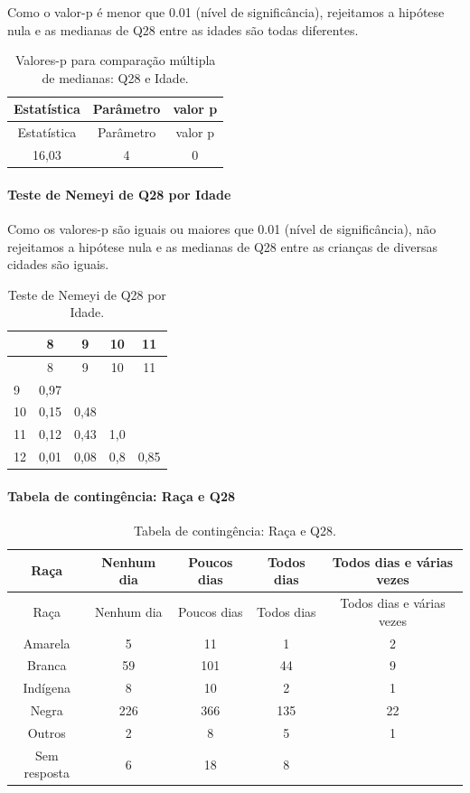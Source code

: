 \documentclass[]{article}
\let\oldparagraph\paragraph
\renewcommand{\paragraph}[1]{\oldparagraph{#1}\mbox{}}
\begin{document}
Como o valor-p é menor que 0.01 (nível de significância), rejeitamos a hipótese nula e as medianas de Q28 entre as idades são todas diferentes.

\begin{longtable}[]{@{}ccc@{}}
\caption{\label{tab:unnamed-chunk-865}Valores-p para comparação múltipla de medianas: Q28 e Idade.}\tabularnewline
\toprule
Estatística & Parâmetro & valor p\tabularnewline
\midrule
\endfirsthead
\toprule
Estatística & Parâmetro & valor p\tabularnewline
\midrule
\endhead
16,03 & 4 & 0\tabularnewline
\bottomrule
\end{longtable}

\hypertarget{teste-de-nemeyi-de-q28-por-idade}{%
\paragraph{Teste de Nemeyi de Q28 por Idade}\label{teste-de-nemeyi-de-q28-por-idade}}

Como os valores-p são iguais ou maiores que 0.01 (nível de significância), não rejeitamos a hipótese nula e as medianas de Q28 entre as crianças de diversas cidades são iguais.

\begin{longtable}[]{@{}lcccc@{}}
\caption{\label{tab:unnamed-chunk-867}Teste de Nemeyi de Q28 por Idade.}\tabularnewline
\toprule
& 8 & 9 & 10 & 11\tabularnewline
\midrule
\endfirsthead
\toprule
& 8 & 9 & 10 & 11\tabularnewline
\midrule
\endhead
9 & 0,97 & & &\tabularnewline
10 & 0,15 & 0,48 & &\tabularnewline
11 & 0,12 & 0,43 & 1,0 &\tabularnewline
12 & 0,01 & 0,08 & 0,8 & 0,85\tabularnewline
\bottomrule
\end{longtable}

\cleardoublepage

\hypertarget{tabela-de-continguxeancia-rauxe7a-e-q28}{%
\paragraph{Tabela de contingência: Raça e Q28}\label{tabela-de-continguxeancia-rauxe7a-e-q28}}

\begin{longtable}[]{@{}ccccc@{}}
\caption{\label{tab:unnamed-chunk-868}Tabela de contingência: Raça e Q28.}\tabularnewline
\toprule
Raça & Nenhum dia & Poucos dias & Todos dias & Todos dias e várias vezes\tabularnewline
\midrule
\endfirsthead
\toprule
Raça & Nenhum dia & Poucos dias & Todos dias & Todos dias e várias vezes\tabularnewline
\midrule
\endhead
Amarela & 5 & 11 & 1 & 2\tabularnewline
Branca & 59 & 101 & 44 & 9\tabularnewline
Indígena & 8 & 10 & 2 & 1\tabularnewline
Negra & 226 & 366 & 135 & 22\tabularnewline
Outros & 2 & 8 & 5 & 1\tabularnewline
Sem resposta & 6 & 18 & 8 &\tabularnewline
\bottomrule
\end{longtable}
\end{document}
